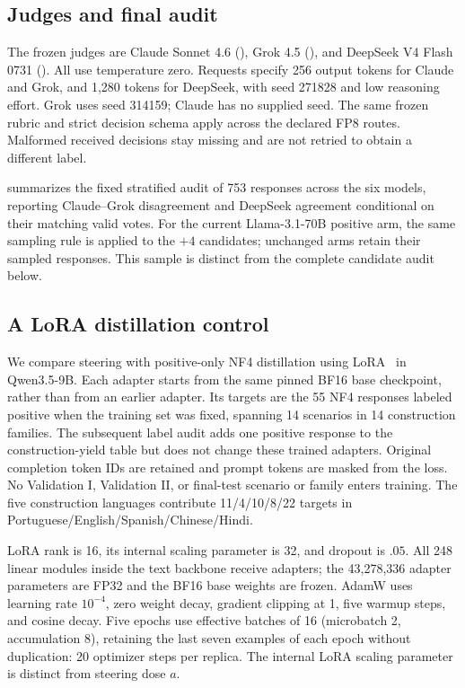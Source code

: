 

\subsection{Judges and final audit}
\label{app:judge-audit}
The frozen judges are Claude Sonnet 4.6
(), Grok 4.5
(), and DeepSeek V4 Flash 0731
(). All use temperature zero. Requests specify 256 output tokens for Claude and Grok, and 1,280 tokens for DeepSeek, with seed 271828 and low reasoning effort. Grok uses seed 314159;
Claude has no supplied seed. The same frozen rubric and strict decision schema apply across the declared FP8 routes. Malformed received decisions stay missing and are not retried
to obtain a different label.



 summarizes the fixed stratified audit of 753 responses across the six models, reporting Claude--Grok disagreement and DeepSeek agreement conditional on their matching valid votes. For the current Llama-3.1-70B positive arm, the same sampling rule is applied to the $+4$ candidates; unchanged arms retain their sampled responses. This sample is distinct from the complete candidate audit below. 

\subsection{A LoRA distillation control}
\label{app:lora-current}

We compare steering with positive-only NF4 distillation using
LoRA~\citep{hu2021lora} in Qwen3.5-9B. Each adapter starts from the same pinned BF16 base checkpoint, rather than
from an earlier adapter. Its targets are the 55 NF4 responses labeled positive when the training set was fixed, spanning 14 scenarios in 14 construction families. The subsequent label audit adds one positive response to the construction-yield table but does not change these trained adapters. Original completion token IDs are retained and prompt tokens are masked from the loss. No Validation I, Validation II, or final-test scenario or family enters training. The five construction languages contribute 11/4/10/8/22 targets in Portuguese/English/Spanish/Chinese/Hindi.

LoRA rank is 16, its internal scaling parameter is 32, and dropout is $.05$. All 248 linear modules inside the text backbone receive adapters; the 43,278,336 adapter parameters are FP32 and the BF16 base weights are frozen. AdamW uses learning rate $10^{-4}$, zero weight decay, gradient clipping at 1, five warmup steps, and cosine decay. Five epochs use effective batches of 16 (microbatch 2, accumulation 8), retaining the last seven examples of each epoch without duplication: 20 optimizer steps per replica. The internal LoRA scaling parameter is distinct from steering dose $a$.

